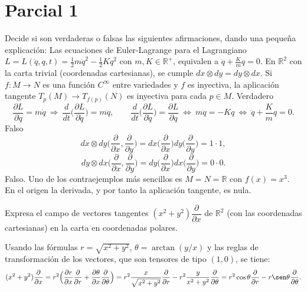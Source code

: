 \section{Parcial 1}
\begin{problem}[1][3 puntos]Decide si son verdaderas o falsas las siguientes afirmaciones, dando una pequeña explicación:
	\ppart Las ecuaciones de Euler-Lagrange para el Lagrangiano $L=L(\dot{q},q,t)=\frac 12 m\dot{q}^2-\frac 12 Kq^2$ con $m,K\in\mathbb{R}^+$, equivalen a $\ddot{q}+\frac{K}{m}q=0$.
	\ppart En $ℝ^2$ con la carta trivial (coordenadas cartesianas), se cumple $dx\otimes dy=dy\otimes dx$.
	\ppart Si $f:M\longrightarrow N$ es una función $C^\infty$ entre variedades y $f$ es inyectiva, la aplicación tangente $T_p(M)\longrightarrow T_{f(p)}(N)$ es inyectiva para cada  $p\in M$. 
	\solution 
	\spart Verdadero $$\frac{\partial L}{\partial \dot{q}}
	=m\dot{q}\ \Rightarrow\ \frac{d}{dt}\Big(\frac{\partial L}{\partial \dot{q}}\Big)=m\ddot{q},\qquad \frac{d}{dt}\Big(\frac{\partial L}{\partial \dot{q}}\Big)=\frac{\partial L}{\partial {q}}\ \Leftrightarrow\ m\ddot{q}= -K q\ \Leftrightarrow\ \ddot{q}+\frac{K}{m}q=0.$$
	\spart Falso $$dx\otimes dy
	\Big(\frac{\partial}{\partial x},\frac{\partial}{\partial y}\Big)
	=
	dx
	\Big(\frac{\partial}{\partial x}\Big)
	dy
	\Big(\frac{\partial}{\partial y}\Big)
	=1\cdot 1,
	$$$$
	dy\otimes dx
	\Big(\frac{\partial}{\partial x},\frac{\partial}{\partial y}\Big)
	=
	dy
	\Big(\frac{\partial}{\partial x}\Big)
	dx
	\Big(\frac{\partial}{\partial y}\Big)
	=0\cdot 0.$$
	\spart Falso. Uno de los contraejemplos más sencillos es $M=N=ℝ$ con $f(x)=x^3$. En el origen la derivada, y por tanto la aplicación tangente, es nula. 
\end{problem}
\newpage
\begin{problem}[2][3 puntos] Expresa el campo de vectores tangentes $(x^2+y^2)\dfrac{\partial}{\partial x}$ de $ℝ^2$ (con las coordenadas cartesianas) en la carta en coordenadas polares. 
	
	\solution Usando las fórmulas $r=\sqrt{x^2+y^2}$, $\theta=\arctan(y/x)$ y las reglas de transformación de los vectores, que son tensores de tipo $(1,0)$, se tiene: $$(x^2+y^2)\frac{\partial}{\partial x}
	=
	r^2\Big(\frac{\partial r}{\partial x}
	\frac{\partial}{\partial r}
	+\frac{\partial \theta}{\partial x}
	\frac{\partial}{\partial \theta}\Big)
	=
	r^2\frac{x}{\sqrt{x^2+y^2}}
	\frac{\partial}{\partial r}
	-r^2\frac{y}{{x^2+y^2}}
	\frac{\partial}{\partial \theta}
	=
	r^2\cos\theta 
	\frac{\partial}{\partial r}
	-r\sen\theta
	\frac{\partial}{\partial \theta}.$$
	
\end{problem}
